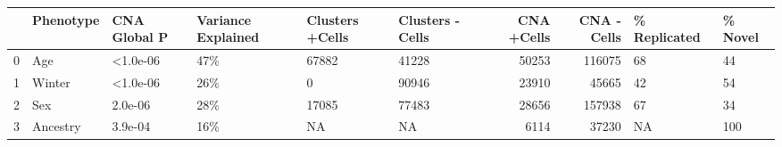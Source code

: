 \begin{tabular}{llllllrrll}
\toprule
{} & Phenotype & CNA Global P & Variance Explained & Clusters +Cells & Clusters -Cells &  CNA +Cells &  CNA -Cells & \% Replicated & \% Novel \\
\midrule
0 &       Age &     <1.0e-06 &                47\% &           67882 &           41228 &       50253 &      116075 &           68 &      44 \\
1 &    Winter &     <1.0e-06 &                26\% &               0 &           90946 &       23910 &       45665 &           42 &      54 \\
2 &       Sex &      2.0e-06 &                28\% &           17085 &           77483 &       28656 &      157938 &           67 &      34 \\
3 &  Ancestry &      3.9e-04 &                16\% &              NA &              NA &        6114 &       37230 &           NA &     100 \\
\bottomrule
\end{tabular}
